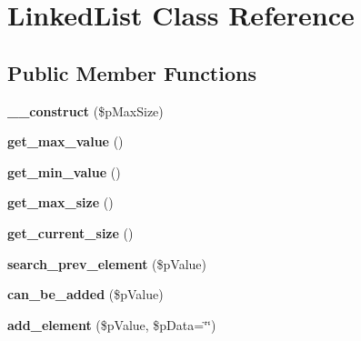 \hypertarget{class_linked_list}{
\section{LinkedList Class Reference}
\label{class_linked_list}
}
\subsection*{Public Member Functions}
\begin{DoxyCompactItemize}
\item 
\hypertarget{class_linked_list_a4f9d3207d7d1a2de384fdf286ed53d7e}{
{\bfseries \_\-\_\-construct} (\$pMaxSize)}
\label{class_linked_list_a4f9d3207d7d1a2de384fdf286ed53d7e}

\item 
\hypertarget{class_linked_list_a4f5bd674575c471f12a70d16787fda3f}{
{\bfseries get\_\-max\_\-value} ()}
\label{class_linked_list_a4f5bd674575c471f12a70d16787fda3f}

\item 
\hypertarget{class_linked_list_ae7fbc8519ca307a9dd72d520e8cfc944}{
{\bfseries get\_\-min\_\-value} ()}
\label{class_linked_list_ae7fbc8519ca307a9dd72d520e8cfc944}

\item 
\hypertarget{class_linked_list_a1387bfda610fb39e29a8211f3a949c0b}{
{\bfseries get\_\-max\_\-size} ()}
\label{class_linked_list_a1387bfda610fb39e29a8211f3a949c0b}

\item 
\hypertarget{class_linked_list_a74ba49e85bb0cd8977fd8d62d20d5169}{
{\bfseries get\_\-current\_\-size} ()}
\label{class_linked_list_a74ba49e85bb0cd8977fd8d62d20d5169}

\item 
\hypertarget{class_linked_list_a4d5b7854b3157b318f3ba4a8c1315f5f}{
{\bfseries search\_\-prev\_\-element} (\$pValue)}
\label{class_linked_list_a4d5b7854b3157b318f3ba4a8c1315f5f}

\item 
\hypertarget{class_linked_list_af3e10e802b38264b5250a1d78a7b056c}{
{\bfseries can\_\-be\_\-added} (\$pValue)}
\label{class_linked_list_af3e10e802b38264b5250a1d78a7b056c}

\item 
\hypertarget{class_linked_list_a715d180ea7a9a028446c5eff029a69a7}{
{\bfseries add\_\-element} (\$pValue, \$pData=\char`\"{}\char`\"{})}
\label{class_linked_list_a715d180ea7a9a028446c5eff029a69a7}


\end{DoxyCompactItemize}
